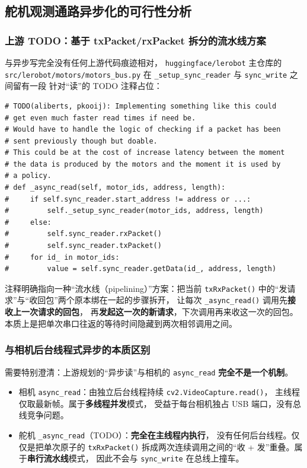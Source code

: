 \subsection{舵机观测通路异步化的可行性分析}\label{sec:async-read}

\subsubsection{上游 TODO：基于 txPacket/rxPacket 拆分的流水线方案}\label{sec:async-read-todo}

与异步写完全没有任何上游代码痕迹相对，
\texttt{huggingface/lerobot} 主仓库的
\texttt{src/lerobot/motors/motors\_bus.py}
在 \texttt{\_setup\_sync\_reader} 与 \texttt{sync\_write} 之间留有一段
针对``读''的 TODO 注释占位：

\begin{verbatim}
# TODO(aliberts, pkooij): Implementing something like this could
# get even much faster read times if need be.
# Would have to handle the logic of checking if a packet has been
# sent previously though but doable.
# This could be at the cost of increase latency between the moment
# the data is produced by the motors and the moment it is used by
# a policy.
# def _async_read(self, motor_ids, address, length):
#     if self.sync_reader.start_address != address or ...:
#         self._setup_sync_reader(motor_ids, address, length)
#     else:
#         self.sync_reader.rxPacket()
#         self.sync_reader.txPacket()
#     for id_ in motor_ids:
#         value = self.sync_reader.getData(id_, address, length)
\end{verbatim}

注释明确指向一种``流水线（pipelining）''方案：把当前 \texttt{txRxPacket()}
中的``发请求''与``收回包''两个原本绑在一起的步骤拆开，
让每次 \texttt{\_async\_read()} 调用先\textbf{接收上一次请求的回包}，
再\textbf{发起这一次的新请求}，下次调用再来收这一次的回包。
本质上是把单次串口往返的等待时间隐藏到两次相邻调用之间。

\subsubsection{与相机后台线程式异步的本质区别}\label{sec:async-read-not-thread}

需要特别澄清：上游规划的``异步读''与相机的 \texttt{async\_read}
\textbf{完全不是一个机制}。
\begin{itemize}[leftmargin=2em]
  \item 相机 \texttt{async\_read}：由独立后台线程持续 \texttt{cv2.VideoCapture.read()}，
        主线程仅取最新帧。属于\textbf{多线程并发}模式，
        受益于每台相机独占 USB 端口，没有总线竞争问题。
  \item 舵机 \texttt{\_async\_read}（TODO）：\textbf{完全在主线程内执行}，
        没有任何后台线程。仅仅是把单次原子的 \texttt{txRxPacket()}
        拆成两次连续调用之间的``收 + 发''重叠。属于\textbf{串行流水线}模式，
        因此不会与 \texttt{sync\_write} 在总线上撞车。
\end{itemize}


